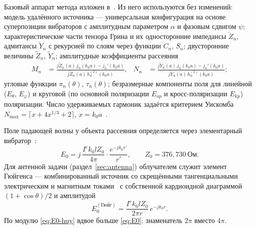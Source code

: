 \documentclass[11pt,a4paper]{article}
\newcommand{\Zl}{\overleftarrow{Z}}
\newcommand{\Zb}{\overleftrightarrow{Z}}
\newcommand{\Yl}{\overleftarrow{Y}}
\newcommand{\Yb}{\overleftrightarrow{Y}}
\newcommand{\hn}{h_n^{(2)}}
\begin{document}
Базовый аппарат метода изложен в~\cite{denisov2016tensors}. Из него используются
без изменений: модель удалённого источника --- универсальная конфигурация на основе
суперпозиции вибраторов с амплитудным параметром $\alpha$ и фазовым сдвигом $\psi$;
характеристические части тензора Грина и их односторонние импедансы $\Zl_n$,
адмитансы $\Yl_n$ с рекурсией по слоям через функции $C_n$, $S_n$; двусторонние
величины $\Zb_n$, $\Yb_n$; амплитудные коэффициенты рассеяния
%
\begin{align}
  \label{eq:Mn}
  M_n &= \frac{j\Zl_n(a)\,j_n(k_0a) - j_n'(k_0a)}{j\Zb_n(a)\,\hn(k_0a)}, &
  N_n &= \frac{j\Yl_n(a)\,j_n(k_0a) - j_n'(k_0a)}{j\Yb_n(a)\,\hn(k_0a)};
\end{align}
%
угловые функции $\pi_n(\theta)$, $\tau_n(\theta)$; безразмерные компоненты поля для
линейной ($E_\theta$, $E_\varphi$) и круговой (по основной поляризации $E_{op}$ и
кросс-поляризации $E_{kp}$) поляризации. Число удерживаемых гармоник задаётся
критерием Уискомба $N_{\max} = \lceil x + 4x^{1/3} + 2\rceil$, $x = k_0a$~\cite{wiscombe1980}.

Поле падающей волны у объекта рассеяния определяется через элементарный
вибратор~\cite[ф-ла~3.18]{panchenko2013}:
%
\begin{equation}
  \label{eq:E0}
  E_0 = j\,\frac{I^e k_0 l Z_0}{4\pi}\cdot\frac{e^{-jk_0r'}}{r'},
  \qquad Z_0 = 376{,}730\ \text{Ом}.
\end{equation}
%
Для антенной задачи (раздел~\ref{sec:antenna}) облучателем служит элемент Гюйгенса
--- комбинированный источник со скрещёнными тангенциальными электрическим и
магнитным токами~\cite[ф-ла~3.14]{panchenko2013} с собственной кардиоидной
диаграммой $(1+\cos\theta)/2$ и амплитудой
%
\begin{equation}
  \label{eq:E0-huy}
  E_0^{(\text{Гюйг})} = \frac{I^{e}k_0lZ_0}{2\pi r}\,e^{-jk_0r}.
\end{equation}
%
По модулю \eqref{eq:E0-huy} вдвое больше \eqref{eq:E0}: знаменатель $2\pi$ вместо
$4\pi$.
\end{document}

